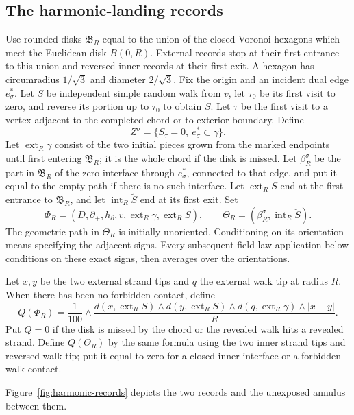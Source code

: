 \subsection{The harmonic-landing records}

Use rounded disks \(\mathfrak B_R\) equal to the union of the closed
Voronoi hexagons which meet the Euclidean disk \(B(0,R)\).  External
records stop at their first entrance to this union and reversed inner
records at their first exit.  A hexagon has circumradius \(1/\sqrt3\)
and diameter \(2/\sqrt3\).
Fix the origin and an incident dual edge \(e_\sigma^*\). Let \(S\)
be independent simple random walk from \(v\), let \(\tau_0\) be
its first visit to zero, and reverse its portion up to \(\tau_0\)
to obtain \(\breve S\). Let \(\tau\) be the first visit to a
vertex adjacent to the completed chord or to exterior boundary.
Define
\[
 Z^\sigma=\{S_\tau=0,\ e_\sigma^*\subset\gamma\}.
\]
Let \(\operatorname{ext}_R\gamma\) consist of the two initial
pieces grown from the marked endpoints until first entering
\(\mathfrak B_R\); it is the whole chord if the disk is missed.
Let \(\beta_R^\sigma\) be the part in \(\mathfrak B_R\) of the
zero interface through \(e_\sigma^*\), connected to that edge,
and put it equal to the empty path if there is no such interface.
Let \(\operatorname{ext}_R S\) end at the first entrance to
\(\mathfrak B_R\), and let \(\operatorname{int}_R\breve S\)
end at its first exit. Set
\[
 \Phi_R=(D,\partial_+,h_\partial,v,
              \operatorname{ext}_R\gamma,\operatorname{ext}_R S),
 \qquad
 \Theta_R=(\beta_R^\sigma,\operatorname{int}_R\breve S).
\]
The geometric path in \(\Theta_R\) is initially unoriented.
Conditioning on its orientation means specifying the adjacent signs.
Every subsequent field-law application below conditions on these
exact signs, then averages over the orientations.

Let \(x,y\) be the two external strand tips and \(q\) the external
walk tip at radius \(R\). When there has been no forbidden contact,
define
\[
 Q(\Phi_R)=\frac1{100}\wedge
 \frac{
 d(x,\operatorname{ext}_R S)\wedge
 d(y,\operatorname{ext}_R S)\wedge
 d(q,\operatorname{ext}_R\gamma)\wedge |x-y|}{R}.
\]
Put \(Q=0\) if the disk is missed by the chord or the revealed walk
hits a revealed strand. Define \(Q(\Theta_R)\) by the same formula
using the two inner strand tips and reversed-walk tip; put it equal
to zero for a closed inner interface or a forbidden walk contact.

Figure~\ref{fig:harmonic-records} depicts the two records and the
unexposed annulus between them.


